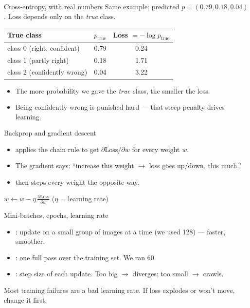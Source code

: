 \documentclass[10pt,aspectratio=169]{beamer}
\begin{document}
\begin{frame}{Cross-entropy, with real numbers}
  Same example: predicted $p=(0.79,0.18,0.04)$. Loss depends only on the \emph{true} class.
  \begin{center}
  \begin{tabular}{@{}lcc@{}}
    \toprule
    \textbf{True class} & $p_{\text{true}}$ & \textbf{Loss} $=-\log p_{\text{true}}$ \\
    \midrule
    class 0 (right, confident) & 0.79 & 0.24 \\
    class 1 (partly right)     & 0.18 & 1.71 \\
    class 2 (confidently wrong)& 0.04 & 3.22 \\
    \bottomrule
  \end{tabular}
  \end{center}
  \begin{itemize}
    \item The more probability we gave the \emph{true} class, the smaller the loss.
    \item Being confidently wrong is punished hard --- that steep penalty drives learning.
  \end{itemize}
\end{frame}

\begin{frame}{Backprop and gradient descent}
  \begin{itemize}
    \item {} applies the chain rule to get $\partial \text{Loss}/\partial w$ for every weight $w$.
    \item The gradient says: ``increase this weight $\rightarrow$ loss goes up/down, this much.''
    \item {} then steps every weight the opposite way.
  \end{itemize}
  \begin{mathbox}
    $\displaystyle w \leftarrow w - \eta\,\frac{\partial \text{Loss}}{\partial w}$ \qquad ($\eta$ = learning rate)
  \end{mathbox}
\end{frame}

\begin{frame}{Mini-batches, epochs, learning rate}
  \begin{itemize}
    \item {}: update on a small group of images at a time (we used 128) --- faster, smoother.
    \item {}: one full pass over the training set. We ran 60.
    \item {}: step size of each update. Too big $\rightarrow$ diverges; too small $\rightarrow$ crawls.
  \end{itemize}
  \begin{badbox}
    Most training failures are a bad learning rate. If loss explodes or won't move, change it first.
  \end{badbox}
\end{frame}
\end{document}
